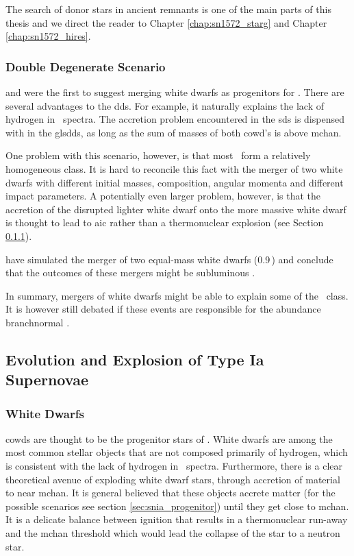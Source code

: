 The search of donor stars in ancient remnants is one of the main parts of this thesis and we direct the reader to Chapter \ref{chap:sn1572_starg} and Chapter \ref{chap:sn1572_hires}.



\subsubsection{Double Degenerate Scenario}
\citet{1984ApJ...277..355W} and \citet{1984ApJS...54..335I} were the first to suggest merging white dwarfs as progenitors for \snia. There are several advantages to the \gls{dds}. For example, it naturally explains the lack of hydrogen in \snia\ spectra. The accretion problem encountered in the \gls{sds} is dispensed with in the gls{dds}, as long as the sum of masses of both \gls{cowd}'s is above \gls{mchan}. 

One problem with this scenario, however, is that most \snia\ form a relatively homogeneous class. It is hard to reconcile this fact with the merger of two white dwarfs with different initial masses, composition, angular momenta and different impact parameters. A potentially even larger problem, however, is that the accretion of the disrupted lighter white dwarf onto the more massive white dwarf is thought to lead to \gls{aic} rather than a thermonuclear explosion (see Section \ref{sec:white_dwarfs}).

\cite{2010Natur.463...61P} have simulated the merger of two equal-mass white dwarfs (0.9\,\msun) and conclude that the outcomes of these mergers might be subluminous \sneia.

In summary, mergers of white dwarfs might be able to explain some of the \snia\ class. It is however still debated if these events are responsible for the abundance \gls{branchnormal} \sneia. 

\subsection{Evolution and Explosion of Type Ia Supernovae}

\subsubsection{White Dwarfs}
\label{sec:white_dwarfs}
\glspl{cowd} are thought to be the progenitor stars of \sneia. White dwarfs are among the most common stellar objects that are not composed primarily of hydrogen, which is consistent with the lack of hydrogen in \snia\ spectra. Furthermore, there is a clear theoretical avenue of exploding white dwarf stars, through accretion of material to near \gls{mchan}. It is general believed that these objects accrete matter (for the possible scenarios see section \ref{sec:snia_progenitor}) until they get close to \gls{mchan}. It is a delicate balance between ignition that results in a thermonuclear run-away and the \gls{mchan} threshold which would lead the collapse of the star to a neutron star.
 
